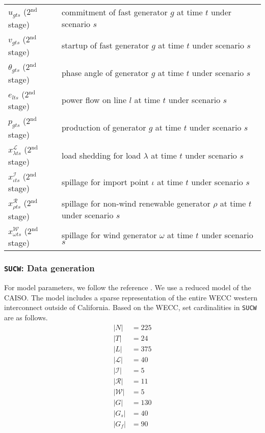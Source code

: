 \begin{table}[]
\begin{tabular}{ll}
		$u_{gts}$ (2$^{\textrm{nd}}$ stage)	&	commitment of fast generator $g$ at time $t$ under scenario $s$\\
		$v_{gts}$ (2$^{\textrm{nd}}$ stage)	&	startup of fast generator $g$ at time $t$ under scenario $s$\\
		$\theta_{gts}$ (2$^{\textrm{nd}}$ stage)	&	phase angle of generator $g$ at time $t$ under scenario $s$\\
		$e_{lts}$ (2$^{\textrm{nd}}$ stage)	&	power flow on line $l$ at time $t$ under scenario $s$\\
		$p_{gts}$ (2$^{\textrm{nd}}$ stage)	&	production of generator $g$ at time $t$ under scenario $s$\\
		$x_{\lambda ts}^\mathcal{L}$	(2$^{\textrm{nd}}$ stage) & load shedding for load $\lambda$ at time $t$ under scenario $s$	\\
		$x_{\iota ts}^\mathcal{I}$	(2$^{\textrm{nd}}$ stage) &	spillage for import point $\iota$ at time $t$ under scenario $s$\\
		$x_{\rho ts}^\mathcal{R}$ (2$^{\textrm{nd}}$ stage)	& spillage for non-wind renewable generator $\rho$ at time $t$ under scenario $s$  	\\
		$x_{\omega ts}^\mathcal{W}$ (2$^{\textrm{nd}}$ stage)	& spillage for wind generator $\omega$ at time $t$ under scenario $s$ 	\\
		\hline
	\end{tabular}
\end{table}

\subsubsection{\texttt{SUCW}: Data generation}
For model parameters, we follow the reference \cite{AF2004}. We use a reduced model of the CAISO. The model includes a sparse representation of the entire WECC western interconnect outside of California. 
Based on the WECC, set cardinalities in \texttt{SUCW} are as follows.
\begin{align*}
|N|&=225 \\
|T|&=24 \\
|L|&=375 \\
|\mathcal{L}|&=40\\
|\mathcal{I}|&=5\\
|\mathcal{R}|&=11\\
|\mathcal{W}|&=5\\
|G|&=130\\
|G_s|&=40\\
|G_f|&=90
\end{align*}

